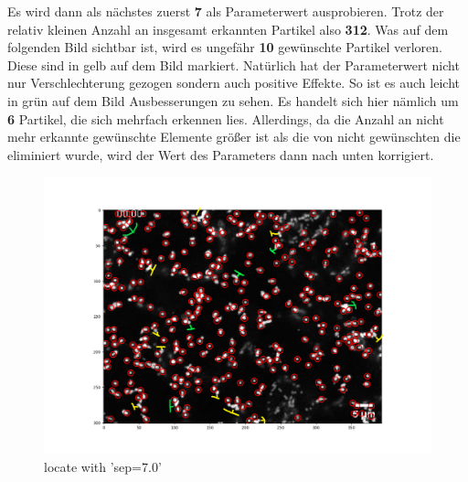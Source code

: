 \begin{enumerate}
Es wird dann als nächstes zuerst \textbf{7} als Parameterwert ausprobieren. Trotz der relativ kleinen Anzahl an insgesamt erkannten Partikel also \textbf{312}. Was auf dem folgenden Bild sichtbar ist, wird es ungefähr \textbf{10} gewünschte Partikel verloren. Diese sind in gelb auf dem Bild markiert. Natürlich hat der Parameterwert nicht nur Verschlechterung gezogen sondern auch positive Effekte. So ist es auch leicht in grün auf dem Bild Ausbesserungen zu sehen. Es handelt sich hier nämlich um \textbf{6} Partikel, die sich mehrfach erkennen lies. 
Allerdings, da die Anzahl an nicht mehr erkannte gewünschte Elemente größer ist als die von nicht gewünschten die eliminiert wurde, wird der Wert des Parameters dann nach unten korrigiert.
\begin{figure}[H]
    \centering
    \includegraphics[scale=0.35]{Grafiken/trackpyBilder/locate_with_separation_(7).png}
    \caption{locate with 'sep=7.0'}
\end{figure}


\end{enumerate}
